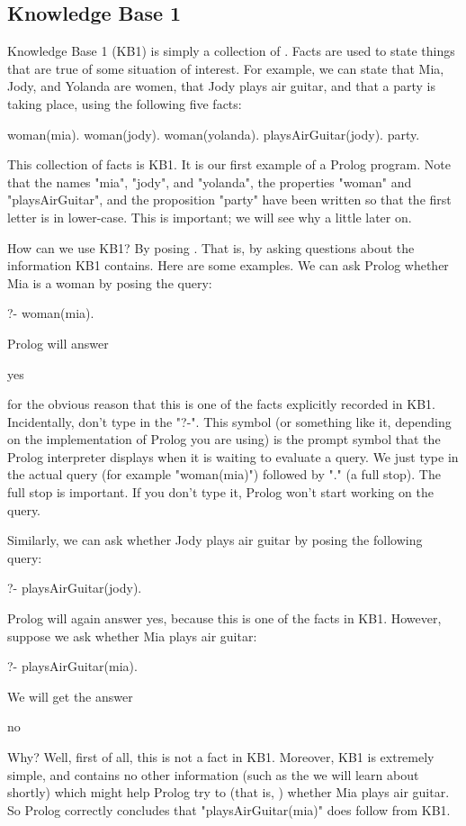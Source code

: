 \subsection*{Knowledge Base 1}\label{SUBSEC.L1.KB1}


Knowledge Base 1 (KB1) is simply a collection of .
Facts are used to state things that are  true
of some situation of interest.  For example, we can state that Mia,
Jody, and Yolanda are women, that Jody plays air guitar, and that a
party is taking place, using the following five facts:

\begin{LPNcodedisplay}
woman(mia).
woman(jody).
woman(yolanda).
playsAirGuitar(jody).
party.
\end{LPNcodedisplay}


This collection of facts is KB1. It is our first example of a Prolog program.
Note that the names "mia", "jody", and "yolanda", the properties "woman" and
"playsAirGuitar", and the proposition "party" have been written so that the
first letter is in lower-case.  This is important; we will see why a little
later on.

How can we use KB1?  By posing . That is, by asking questions
about the information KB1 contains.  Here are some examples.  We can ask Prolog
whether Mia is a woman by posing the query:
\begin{LPNcodedisplay}
?- woman(mia).
\end{LPNcodedisplay}
Prolog will answer
\begin{LPNcodedisplay}
yes
\end{LPNcodedisplay}
for the obvious reason that this is one of the facts explicitly
recorded in KB1.  Incidentally,  don't type in the "?-".
This symbol (or something like it, depending on the implementation of
Prolog you are using) is the prompt symbol that the Prolog interpreter
displays when it is waiting to evaluate a query.  We just type in the
actual query (for example "woman(mia)") followed by "." (a full stop).
The full stop is important. If you don't type it, Prolog won't start
working on the query.

Similarly, we can ask whether Jody plays air guitar by posing the
following query:

\begin{LPNcodedisplay}
?- playsAirGuitar(jody).
\end{LPNcodedisplay}
Prolog will again answer yes, because this is one of the facts in
KB1.  However, suppose we ask whether Mia plays air guitar:
\begin{LPNcodedisplay}
?- playsAirGuitar(mia).
\end{LPNcodedisplay}
We will get the answer
\begin{LPNcodedisplay}
no
\end{LPNcodedisplay}
Why? Well, first of all, this is not a fact in KB1. Moreover, KB1 is
extremely simple, and contains no other information (such as the
 we will learn about shortly) which might help Prolog
try to  (that is, ) whether Mia plays air
guitar. So Prolog correctly concludes that "playsAirGuitar(mia)" does
 follow from KB1.

